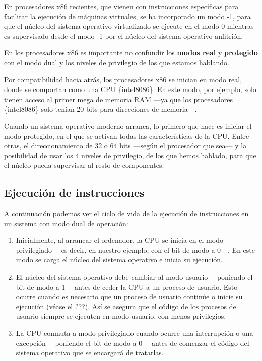 En procesadores x86 recientes, que vienen con instrucciones específicas
para facilitar la ejecución de máquinas virtuales, se ha incorporado un
modo -1, para que el núcleo del sistema operativo virtualizado se
ejecute en el modo 0 mientras es supervisado desde el modo -1 por el
núcleo del sistema operativo anfitrión.

En los procesadores x86 es importante no confundir los \textbf{modos
real}{} y \textbf{protegido}{} con el modo dual y los niveles de
privilegio de los que estamos hablando.

Por compatibilidad hacia atrás, los procesadores x86 se inician en modo
real, donde se comportan como una CPU \{intel8086\}. En este modo, por
ejemplo, solo tienen acceso al primer mega de memoria RAM ---ya que los
procesadores \{intel8086\} solo tenían 20 bits para direcciones de
memoria---.

Cuando un sistema operativo moderno arranca, lo primero que hace es
iniciar el modo protegido, en el que se activan todas las
características de la CPU. Entre otras, el direccionamiento de 32 o 64
bits ---según el procesador que sea--- y la posibilidad de usar los 4
niveles de privilegio, de los que hemos hablado, para que el núcleo
pueda supervisar al resto de componentes.

\subsection{Ejecución de
instrucciones}\label{_ejecuciuxf3n_de_instrucciones}

A continuación podemos ver el ciclo de vida de la ejecución de
instrucciones en un sistema con modo dual de operación:

\begin{enumerate}
\def\labelenumi{\arabic{enumi}.}
\item
  Inicialmente, al arrancar el ordenador, la CPU se inicia en el modo
  privilegiado ---es decir, en nuestro ejemplo, con el bit de modo a
  0---. En este modo se carga el núcleo del sistema operativo e inicia
  su ejecución.
\item
  El núcleo del sistema operativo debe cambiar al modo usuario
  ---poniendo el bit de modo a 1--- antes de ceder la CPU a un proceso
  de usuario. Esto ocurre cuando es necesario que un proceso de usuario
  continúe o inicie su ejecución (véase el
  \hyperref[_el_asignador]{???}). Así se asegura que el código de los
  procesos de usuario siempre se ejecuten en modo usuario, con menos
  privilegios.
\item
  La CPU conmuta a modo privilegiado cuando ocurre una interrupción o
  una excepción ---poniendo el bit de modo a 0--- antes de comenzar el
  código del sistema operativo que se encargará de tratarlas.
\end{enumerate}


